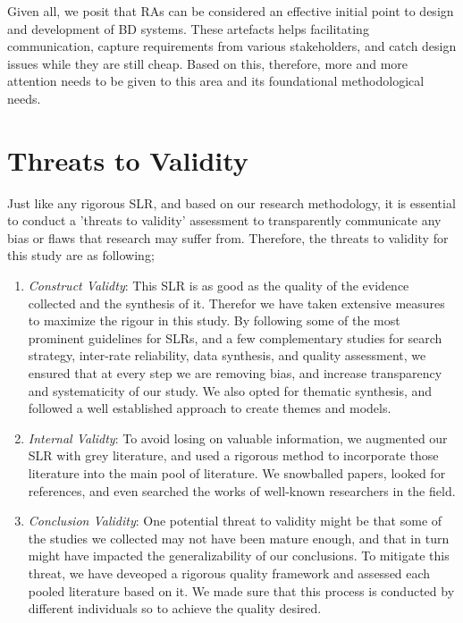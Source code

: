 \documentclass{ieeeaccess}
\begin{document}
Given all, we posit that RAs can be considered an effective initial point to design and development of BD systems. These artefacts helps facilitating communication, capture requirements from various stakeholders, and catch design issues while they are still cheap. Based on this, therefore, more and more attention needs to be given to this area and its foundational methodological needs. 

\section{Threats to Validity}

Just like any rigorous SLR, and based on our research methodology, it is essential to conduct a 'threats to validity' assessment to transparently communicate any bias or flaws that research may suffer from. Therefore, the threats to validity for this study are as following;

\begin{enumerate}
    \item \emph{Construct Validty}: This SLR is as good as the quality of the evidence collected and the synthesis of it. Therefor we have taken extensive measures to maximize the rigour in this study. By following some of the most prominent guidelines for SLRs, and a few complementary studies for search strategy, inter-rate reliability, data synthesis, and quality assessment, we ensured that at every step we are removing bias, and increase transparency and systematicity of our study. We also opted for thematic synthesis, and followed a well established approach to create themes and models.
    \item \emph{Internal Validty}: To avoid losing on valuable information, we augmented our SLR with grey literature, and used a rigorous method to incorporate those literature into the main pool of literature. We snowballed papers, looked for references, and even searched the works of well-known researchers in the field. 
    \item \emph{Conclusion Validity}: One potential threat to validity might be that some of the studies we collected may not have been mature enough, and that in turn might have impacted the generalizability of our conclusions. To mitigate this threat, we have deveoped a rigorous quality framework and assessed each pooled literature based on it. We made sure that this process is conducted by different individuals so to achieve the quality desired. 
\end{enumerate}
\end{document}
